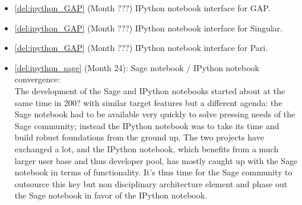 \begin{Workpackage}{\thewpno}
\begin{WPDeliverables}
  \begin{itemize}
  \item \ref{del:ipython_GAP} (Month ???) IPython notebook interface for GAP.
  \item \ref{del:ipython_GAP} (Month ???) IPython notebook interface for Singular.
  \item \ref{del:ipython_GAP} (Month ???) IPython notebook interface for Pari.
  \item \ref{del:ipython_sage} (Month 24): Sage
    notebook / IPython notebook convergence:\\
    The development of the Sage and IPython notebooks started about at
    the same time in 200? with similar target features but a different
    agenda: the Sage notebook had to be available very quickly to
    solve pressing needs of the Sage community; instead the IPython
    notebook was to take its time and build robust foundations from
    the ground up. The two projects have exchanged a lot, and the
    IPython notebook, which benefits from a much larger user base and
    thus developer pool, has mostly caught up with the Sage notebook
    in terms of functionality. It's thus time for the Sage community
    to outsource this key but non disciplinary architecture element
    and phase out the Sage notebook in favor of the IPython notebook.


\end{itemize}
\end{WPDeliverables}
\end{Workpackage}
